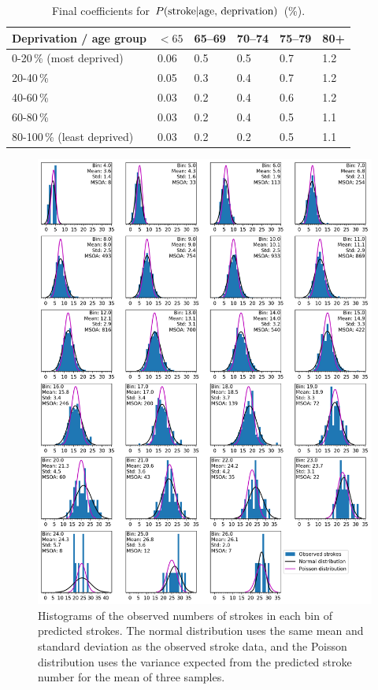 \documentclass[12pt]{extarticle}
\begin{document}
\begin{table}
\centering
\caption{Final coefficients for $P(\textnormal{stroke} | \textnormal{age, deprivation})$ (\%).}
    \begin{tabular}{l l l l l l}
    Deprivation / age group & $<65$ & 65--69 & 70--74 & 75--79 & 80+ \\
    \hline
    0-20\,\% (most deprived) & 0.06 & 0.5 & 0.5 & 0.7 & 1.2 \\
    20-40\,\% & 0.05 & 0.3 & 0.4 & 0.7 & 1.2 \\
    40-60\,\% & 0.03 & 0.2 & 0.4 & 0.6 & 1.2 \\
    60-80\,\% & 0.03 & 0.2 & 0.4 & 0.5 & 1.1 \\
    80-100\,\% (least deprived) & 0.03 & 0.2 & 0.2 & 0.5 & 1.1 \\
    \end{tabular}
    \label{tab:final_coeffs}
\end{table}




\begin{figure}
    \centering
    \includegraphics[width=1.0\linewidth]{images/uncertainty_observed_admissions_variance.png}
    \caption{
        Histograms of the observed numbers of strokes in each bin of predicted strokes. 
        The normal distribution uses the same mean and standard deviation as the observed stroke data,
        and the Poisson distribution uses the variance expected from the predicted stroke number for the mean of three samples.
        }
    \label{fig:uncertainty_hists}
\end{figure}
\end{document}
